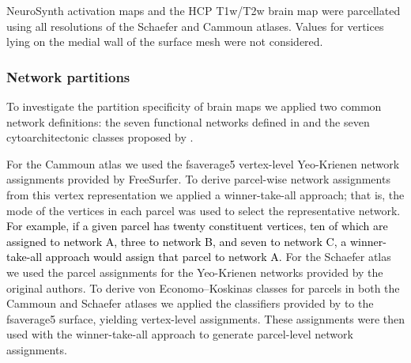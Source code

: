 \documentclass[12pt,aps,pra,reprint,showkeys]{revtex4-1}
\newcommand{\nimg}[1]{\textcolor{black}{{#1}}}
\begin{document}
NeuroSynth activation maps and the HCP T1w/T2w brain map were parcellated using all resolutions of the Schaefer and Cammoun atlases.
Values for vertices lying on the medial wall of the surface mesh were not considered.

\subsubsection*{Network partitions}

To investigate the partition specificity of brain maps we applied two common network definitions: the seven functional networks defined in \citet{yeo2011organization} and the seven cytoarchitectonic classes proposed by \citet{voneconomo1925cytoarchitecture}.

For the Cammoun atlas we used the fsaverage5 vertex-level Yeo-Krienen network assignments provided by FreeSurfer.
To derive parcel-wise network assignments from this vertex representation we applied a winner-take-all approach; that is, the mode of the vertices in each parcel was used to select the representative network.
\nimg{For example, if a given parcel has twenty constituent vertices, ten of which are assigned to network A, three to network B, and seven to network C, a winner-take-all approach would assign that parcel to network A.}
For the Schaefer atlas we used the parcel assignments for the Yeo-Krienen networks provided by the original authors.
To derive von Economo--Koskinas classes for parcels in both the Cammoun and Schaefer atlases we applied the classifiers provided by \citet{scholtens2018neuroimage} to the fsaverage5 surface, yielding vertex-level assignments.
These assignments were then used with the winner-take-all approach to generate parcel-level network assignments.
\end{document}
